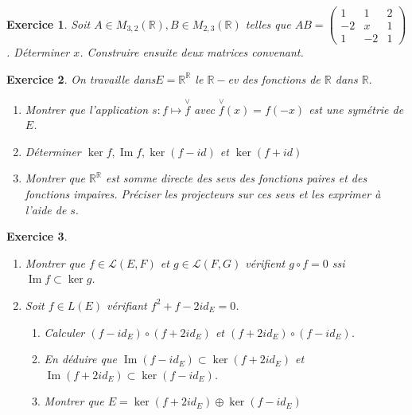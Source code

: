 \documentclass[12pt,a4paper]{article}
\newcommand{\R}{\mathbb{R}}
\DeclareMathOperator{\Ima }{Im}
\theoremstyle{break}
\theoremstyle{break}
\newtheorem{Exo}{Exercice}
\begin{document}
\begin{Exo}
	Soit $A\in M_{3,2}\left( \mathbb{R} \right),B\in M_{2,3}\left( \mathbb{R} \right)$ telles que $AB=\left( \begin{matrix} 1& 1& 2\\ -2& x& 1\\ 1& -2& 1\end{matrix} \right)$. Déterminer $x$. Construire ensuite deux matrices convenant.
\end{Exo}

\begin{Exo}
	 On travaille dans$E=\R^{\R}$ le $\R-$ev des fonctions de $\R$ dans $\R.$

\begin{enumerate}
	\item Montrer que l'application $s:f\mapsto \overset{\vee }{f}$ avec $\overset{\vee }{f}\left( x\right) =f\left( -x\right) $ est une symétrie de $E$.
	
	\item Déterminer $\ker f,\Ima  f,\ker \left( f-id\right) $ et $\ker \left( f+id\right) $
	
	\item Montrer que $\R^{\R}$ est somme directe des sevs des fonctions paires et des fonctions impaires. Préciser les projecteurs sur ces sevs et les exprimer à l'aide de $s.$
\end{enumerate}
\end{Exo}




\begin{Exo}\ 
	\begin{enumerate}
	\item
	Montrer que  $f \in \mathcal{L}(E,F)$ et  $g \in \mathcal{L}(F,G)$ vérifient $g \circ f=0$ ssi $\Ima f \subset \ker g$.
	\item Soit $f\in L(E)$ vérifiant $f^2+f-2id_{E}=0$.
	\begin{enumerate}
		\item Calculer $(f-id_{E})\circ (f+2id_{E})$ et $(f+2id_{E})\circ (f-id_{E})$.
		\item En déduire que $\Ima (f-id_{E})\subset \ker (f+2id_{E})$ et $\Ima (f+2id_{E})\subset \ker (f-id_{E})$.
		\item Montrer que $E=\ker (f+2id_{E})\oplus \ker (f-id_{E})$
	\end{enumerate}
\end{enumerate}
\end{Exo}
\end{document}
